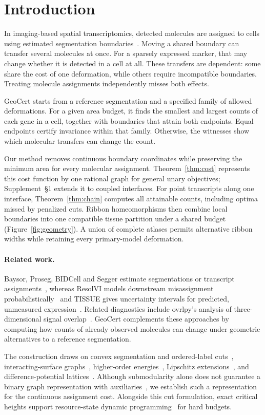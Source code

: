\documentclass[10pt,letterpaper]{article}
\begin{document}
\section{Introduction}
In imaging-based spatial transcriptomics, detected molecules are assigned to cells using estimated segmentation boundaries~\cite{baysor,proseg}. Moving a shared boundary can transfer several molecules at once. For a sparsely expressed marker, that may change whether it is detected in a cell at all. These transfers are dependent: some share the cost of one deformation, while others require incompatible boundaries. Treating molecule assignments independently misses both effects.

GeoCert starts from a reference segmentation and a specified family of allowed deformations. For a given area budget, it finds the smallest and largest counts of each gene in a cell, together with boundaries that attain both endpoints. Equal endpoints certify invariance within that family. Otherwise, the witnesses show which molecular transfers can change the count.

Our method removes continuous boundary coordinates while preserving the minimum area for every molecular assignment. Theorem~\ref{thm:cost} represents this cost function by one rational graph for general unary objectives; Supplement~\S1 extends it to coupled interfaces. For point transcripts along one interface, Theorem~\ref{thm:chain} computes all attainable counts, including optima missed by penalized cuts. Ribbon homeomorphisms then combine local boundaries into one compatible tissue partition under a shared budget (Figure~\ref{fig:geometry}). A union of complete atlases permits alternative ribbon widths while retaining every primary-model deformation.

\paragraph{Related work.}
Baysor, Proseg, BIDCell and Segger estimate segmentations or transcript assignments~\cite{baysor,proseg,bidcell,segger}, whereas ResolVI models downstream misassignment probabilistically~\cite{resolvi} and TISSUE gives uncertainty intervals for predicted, unmeasured expression~\cite{tissue}. Related diagnostics include ovrlpy's analysis of three-dimensional signal overlap~\cite{ovrlpy}. GeoCert complements these approaches by computing how counts of already observed molecules can change under geometric alternatives to a reference segmentation.

The construction draws on convex segmentation and ordered-label cuts~\cite{hochbaum,ishikawa}, interacting-surface graphs~\cite{li,shah}, higher-order energies~\cite{kz,kohli}, Lipschitz extensions~\cite{mcshane,whitney}, and difference-potential lattices~\cite{felsner}. Although submodularity alone does not guarantee a binary graph representation with auxiliaries~\cite{zivny}, we establish such a representation for the continuous assignment cost. Alongside this cut formulation, exact critical heights support resource-state dynamic programming~\cite{joksch} for hard budgets.
\end{document}
